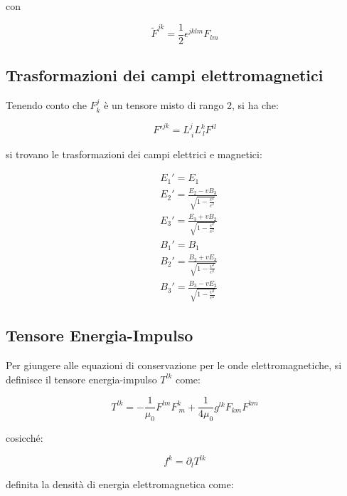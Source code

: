 \documentclass{article}
\begin{document}
con

\begin{equation}
    \tilde F^{jk}=\frac{1}{2}\epsilon^{jklm}F_{lm}
\end{equation}

\subsection{Trasformazioni dei campi elettromagnetici}

Tenendo conto che $F^j_k$ è un tensore misto di rango 2, si ha che:

\begin{equation}
    F'^{jk}=L^j_{\ i}L^k_{\ l}F^{il}
\end{equation}

si trovano le trasformazioni dei campi elettrici e magnetici:

\begin{equation}
    \begin{aligned}
         & E_1'=E_1                                       \\
         & E_2'=\frac{E_2-vB_3}{\sqrt{1-\frac{v^2}{c^2}}} \\
         & E_3'=\frac{E_3+vB_2}{\sqrt{1-\frac{v^2}{c^2}}} \\
         & B_1'=B_1                                       \\
         & B_2'=\frac{B_2+vE_3}{\sqrt{1-\frac{v^2}{c^2}}} \\
         & B_3'=\frac{B_3-vE_2}{\sqrt{1-\frac{v^2}{c^2}}}
    \end{aligned}
\end{equation}

\subsection{Tensore Energia-Impulso}
Per giungere alle equazioni di conservazione per le onde elettromagnetiche, si definisce il tensore
energia-impulso $T^{lk}$ come:

\begin{equation}
    T^{lk}=-\frac{1}{\mu_0}F^{lm}F^k_{\ m}+\frac{1}{4\mu_0}g^{lk}F_{km}F^{km}
\end{equation}

cosicché:

\begin{equation}
    f^k=\partial_l T^{lk}
\end{equation}

definita la densità di energia elettromagnetica come:
\end{document}
